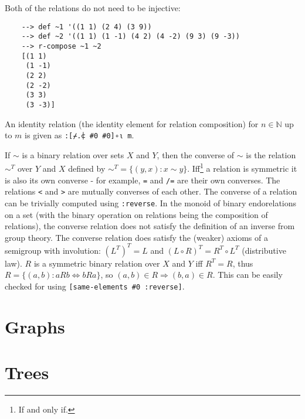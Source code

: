 Both of the relations do not need to be injective:

\begin{Verbatim}
    --> def ~1 '((1 1) (2 4) (3 9))
    --> def ~2 '((1 1) (1 -1) (4 2) (4 -2) (9 3) (9 -3))
    --> r-compose ~1 ~2
    [(1 1)
     (1 -1)
     (2 2)
     (2 -2)
     (3 3)
     (3 -3)]
\end{Verbatim}

An identity relation (the identity element for relation composition) for $n \in \mathbb{N}$ up to $m$ is given as \verb|:[⌿.⍧ #0 #0]∘⍳ m|.

If $\sim$ is a binary relation over sets $X$ and $Y$, then the converse of $\sim$ is the relation $\sim^T$ over $Y$ and $X$ defined by $\displaystyle \sim^T = \{(y,x):x\sim y\}$. Iff\footnote{If and only if.} a relation is symmetric it is also its own converse - for example, \verb|=| and \verb|/=| are their own converses. The relations \verb|<| and \verb|>| are mutually converses of each other. The converse of a relation can be trivially computed using \verb|:reverse|. In the monoid of binary endorelations on a set (with the binary operation on relations being the composition of relations), the converse relation does not satisfy the definition of an inverse from group theory. The converse relation does satisfy the (weaker) axioms of a semigroup with involution: $\left(L^T\right)^T=L$ and $(L\circ R)^T=R^T\circ L^T$ (distributive law). $R$ is a symmetric binary relation over $X$ and $Y$ iff $R^T = R$, thus $R = \{(a,b): a R b \Leftrightarrow b R a \}$, so $(a,b)\in R \Rightarrow (b,a)\in R$. This can be easily checked for using \verb|[same-elements #0 :reverse]|.

\section{Graphs}

\section{Trees}
